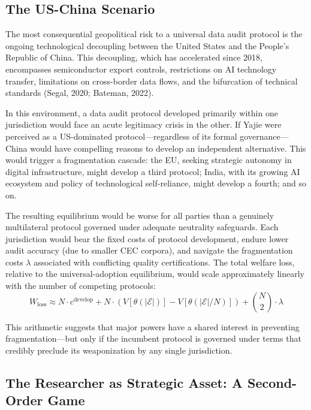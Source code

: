 \documentclass[12pt,a4paper]{ctexart}
\theoremstyle{definition}
\theoremstyle{remark}
\begin{document}
\subsection{The US-China Scenario}

The most consequential geopolitical risk to a universal data audit protocol is the ongoing technological decoupling between the United States and the People's Republic of China. This decoupling, which has accelerated since 2018, encompasses semiconductor export controls, restrictions on AI technology transfer, limitations on cross-border data flows, and the bifurcation of technical standards (Segal, 2020; Bateman, 2022).

In this environment, a data audit protocol developed primarily within one jurisdiction would face an acute legitimacy crisis in the other. If Yajie were perceived as a US-dominated protocol—regardless of its formal governance—China would have compelling reasons to develop an independent alternative. This would trigger a fragmentation cascade: the EU, seeking strategic autonomy in digital infrastructure, might develop a third protocol; India, with its growing AI ecosystem and policy of technological self-reliance, might develop a fourth; and so on.

The resulting equilibrium would be worse for all parties than a genuinely multilateral protocol governed under adequate neutrality safeguards. Each jurisdiction would bear the fixed costs of protocol development, endure lower audit accuracy (due to smaller CEC corpora), and navigate the fragmentation costs $\lambda$ associated with conflicting quality certifications. The total welfare loss, relative to the universal-adoption equilibrium, would scale approximately linearly with the number of competing protocols:
\begin{equation}
W_{\text{loss}} \approx N \cdot c^{\text{develop}} + N \cdot (V[\theta(|\mathcal{E}|)] - V[\theta(|\mathcal{E}|/N)]) + \binom{N}{2} \cdot \lambda
\end{equation}

This arithmetic suggests that major powers have a shared interest in preventing fragmentation—but only if the incumbent protocol is governed under terms that credibly preclude its weaponization by any single jurisdiction.

\subsection{The Researcher as Strategic Asset: A Second-Order Game}
\end{document}
